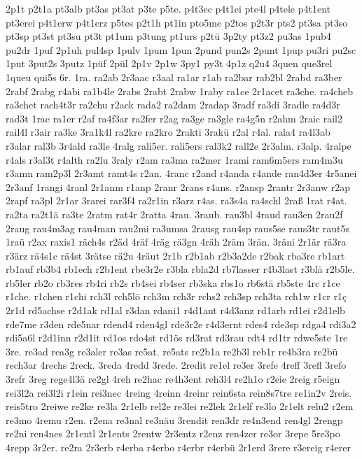 {2p1t
p2t1a
pt3alb
pt3as
pt3at
p3te
p5te.
p4t3ec
p4t1ei
pte4l
p4tele
p4t1ent
pt3erei
p4t1erw
p4t1erz
p5tes
p2t1h
pt1in
pto5me
p2tos
p2t3r
pts2
pt3sa
pt3so
pt3sp
pt3st
pt3su
pt3t
pt1um
p3tung
pt1urs
p2tü
3p2ty
pt3z2
pu3as
1pub4
pu2dr
1puf
2p1uh
pul4sp
1pulv
1pum
1pun
2pund
pun2s
2punt
1pup
pu3ri
pu2sc
1put
3put2s
3putz
1püf
2pül
2p1v
2p1w
3py1
py3t
4p1z
q2u4
3quen
que3rel
1queu
qui5s
6r.
1ra.
ra2ab
2r3aac
r3aal
ra1ar
r1ab
ra2bar
rab2bl
2rabd
ra3ber
2rabf
2rabg
r4abi
ra1b4le
2rabs
2rabt
2rabw
1raby
ra1ce
2r1acet
ra3che.
ra4cheb
ra3chet
rach4t3r
ra2chu
r2ack
rada2
ra2dam
2radap
3radf
ra3di
3radle
ra4d3r
rad3t
1rae
ra1er
r2af
ra4f3ar
ra2fer
r2ag
ra3ge
ra3gle
ra4g5n
r2ahm
2raic
rail2
rail4l
r3air
ra3ke
3ra1k4l
ra2kre
ra2kro
2rakti
3rakü
r2al
r4al.
rala4
ra4l3ab
r3alar
ral3b
3r4ald
ra3le
4ralg
rali5er.
rali5ers
ral3k2
rall2e
2r3alm.
r3alp.
4ralpe
r4als
r3al3t
r4alth
ra2lu
3raly
r2am
ra3ma
ra2mer
1rami
ram6m5ers
ram4m3u
r3amn
ram2p3l
2r3amt
ramt4s
r2an.
4ranc
r2and
r4anda
r4ande
ran4d3er
4r5anei
2r3anf
1rangi
4ranl
2r1anm
r1anp
2ranr
2rans
r4ans.
r2ansp
2rantr
2r3anw
r2ap
2rapf
ra3pl
2r1ar
3rarei
rar3f4
ra2r1in
r3arz
r4as.
ra3s4a
ra4schl
2raß
1rat
r4at.
ra2ta
ra2t1ä
ra3te
2ratm
rat4r
2ratta
4rau.
3raub.
rau3bl
4raud
rau3en
2rau2f
2raug
rau4m3ag
rau4man
rau2mi
ra3umsa
2rausg
rau4sp
raus5se
raus3tr
raut5s
1raü
r2ax
raxis1
räch4s
r2äd
4räf
4räg
rä3gn
4räh
2räm
3rän.
3räni
2r1är
rä3ra
r3ärz
rä4s1c
rä4st
3rätse
rä2u
4räut
2r1b
r2b1ab
r2b3a2de
r2bak
rba3re
rb1art
rb1auf
rb3b4
rb1ech
r2b1ent
rbe3r2e
r3bla
rbla2d
rb7lasser
r4b3last
r3blä
r2b5le.
rb5ler
rb2o
rb3res
rb4ri
rb2s
rb4sei
rb4ser
rb3ska
rbs1o
rb6stä
rb5ste
4rc
r1ce
r1che.
r1chen
r1chi
rch3l
rch5lö
rch3m
rch3r
rchs2
rch3sp
rch3ta
rch1w
r1cr
r1ç
2r1d
rd5achse
r2d1ak
rd1al
r3dan
rdani1
r4d1ant
r4d3anz
rd1arb
rd1ei
r2d1elb
rde7me
r3den
rde5nar
rdend4
rden4gl
rde3r2e
r4d3ernt
rdes4
rde3sp
rdga4
rdi3a2
rdi5a6l
r2d1inn
r2d1it
rd1os
rdo4st
rd1ös
rd3rat
rd3rau
rdt4
rd1tr
rdwe5ste
1re
3re.
re3ad
rea3g
re3aler
re3as
re5at.
re5ats
re2b1a
re2b3l
reb1r
re4b3ra
re2bü
rech3ar
4rechs
2reck.
3reda
4redd
3rede.
2redit
re1el
re3er
3refe
4reff
3refl
3refo
3refr
3reg
rege4l3ä
re2gl
4reh
re2hac
re4h3ent
reh3l4
re2h1o
r2eie
2reig
r5eign
rei3l2a
rei3l2i
r1ein
rei3nec
4reing
4reinn
4reinr
rein6sta
rein8s7tre
re1in2v
2reis.
reis5tro
2reiwe
re2ke
re3la
2r1elb
rel2e
re3lei
re2lek
2r1elf
re3lo
2r1elt
relu2
r2em
re3mo
4remu
r2en.
r2ena
re3nal
re3näu
3rendit
ren3dr
re4n3end
ren4gl
2rengp
re2ni
ren4nes
2r1entl
2r1ents
2rentw
2r3entz
r2enz
ren4zer
re3or
3repe
5re3po
4repp
3r2er.
re2ra
2r3erb
r4erba
r4erbo
r4erbr
r4erbü
2r1erd
3rere
r3ereig
r4erer
}
